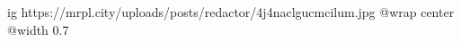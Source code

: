  
 
 
 
 

\ifcmt
  ig https://mrpl.city/uploads/posts/redactor/4j4naclgucmcilum.jpg
  @wrap center
  @width 0.7
\fi
